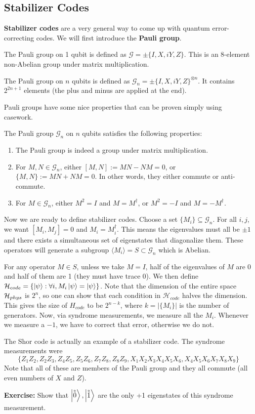 \subsection{Stabilizer Codes}
\textbf{Stabilizer codes} are a very general way to come up with quantum error-correcting codes. We will first introduce the \textbf{Pauli group}.
\begin{definition}
    The Pauli group on 1 qubit is defined as $\mathcal{G}= \pm \{I, X, iY, Z\}$. This is an 8-element non-Abelian group under matrix multiplication.

    The Pauli group on $n$ qubits is defined as $\mathcal{G}_n = \pm \{I, X, iY, Z\}^{\otimes n}$. It contains $2^{2n + 1}$ elements (the plus and minus are applied at the end).
\end{definition}
Pauli groups have some nice properties that can be proven simply using casework.
\begin{theorem}
    The Pauli group $\mathcal{G}_n$ on $n$ qubits satisfies the following properties:
    \begin{enumerate}
    \item The Pauli group is indeed a group under matrix multiplication.
    \item For $M, N \in \mathcal{G}_n$, either $[M, N] := MN - NM = 0$,
    or $\{M, N\} := MN + NM = 0$. In other words, they either commute or anti-commute.
    \item For $M \in \mathcal{G}_n$, either $M^2 = I$ and $M = M^{\dagger}$, or $M^2 = -I$ and $M = -M^{\dagger}$.
    \end{enumerate}
\end{theorem}
Now we are ready to define stabilizer codes. Choose a set $\{ M_i \} \subseteq \mathcal{G}_n$. For all $i, j$,
we want $[M_i, M_j] = 0$ and $M_i = M_i^{\dagger}$. This means the eigenvalues must all be $\pm 1$ and
there exists a simultaneous set of eigenstates that diagonalize them. These operators will generate a subgroup $\langle M_i \rangle = S \subset \mathcal{G}_n$
which is Abelian. 

For any operator $M \in S$, unless we take $M = I$, half of the eigenvalues of $M$ are 0 and half of them are 1 (they must have trace 0).
We then define $\operatorname{\mathcal{H}}_{code} = \{ \ket{\psi} : \forall i,  M_i \ket{\psi} = \ket{\psi} \}$. Note that the dimension of the
entire space $\operatorname{\mathcal{H}}_{phys}$ is $2^n$, so one can show that each condition in $\mathcal{H}_{code}$ halves the dimension. This gives the size of $H_{code}$ to be
$2^{n - k}$, where $k = |\{M_i\}|$ is the number of generators. Now, via syndrome measurements,
we measure all the $M_i$. Whenever we measure a $-1$, we have to correct that error, otherwise we do not.
\begin{example}
    The Shor code is actually an example of a stabilizer code. The syndrome measurements were 
    \[ \{ Z_1 Z_2, Z_2 Z_3, Z_4 Z_5, Z_5 Z_6, Z_7 Z_8, Z_8 Z_9, X_1 X_2 X_3 X_4 X_5 X_6, X_4 X_5 X_6 X_7 X_8 X_9 \}\]
    Note that all of these are members of the Pauli group and they all commute (all even numbers of $X$ and $Z$).

    \textbf{Exercise:} Show that $\ket{\tilde{\tilde{0}}}, \ket{\tilde{\tilde{1}}}$ are the only +1 eigenstates of this syndrome measurement.
\end{example}
